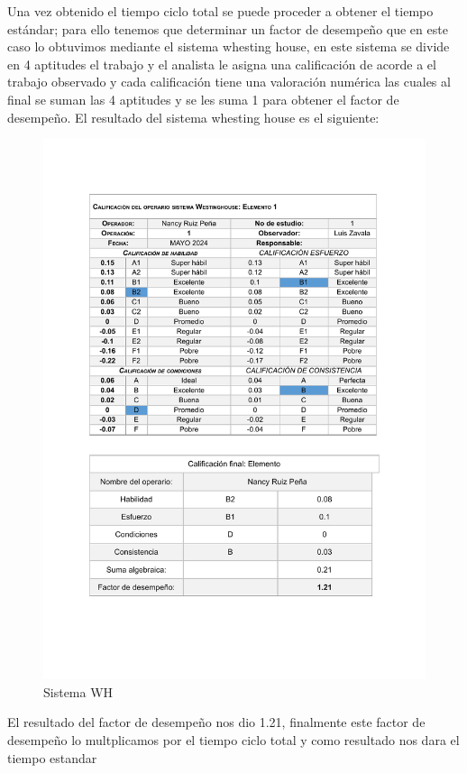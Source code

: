     Una vez obtenido el tiempo ciclo total se puede proceder a obtener el tiempo estándar; para ello tenemos que determinar un factor de desempeño que en este caso lo obtuvimos mediante el sistema whesting house, en este sistema se divide en 4 aptitudes el trabajo y el analista le asigna una calificación de acorde a el trabajo observado y cada calificación tiene una valoración numérica las cuales al final se suman las 4 aptitudes y se les suma 1 para obtener el factor de desempeño. El resultado del sistema whesting house es el siguiente:
    \begin{figure}[H]
        \centering
        \includegraphics[scale=0.43]{35/Img/sistemaWH.pdf}
        \caption{Sistema WH}
    \end{figure}
    
    El resultado del factor de desempeño nos dio 1.21, finalmente este factor de desempeño lo multplicamos por el tiempo ciclo total y como resultado nos dara el tiempo estandar
    
